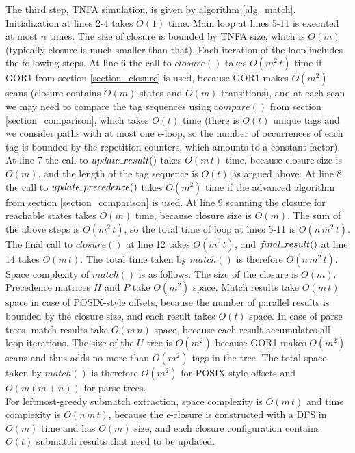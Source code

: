 \documentclass[AMA,STIX1COL]{WileyNJD-v2}
\newcommand{\Xund}{\rule{.4em}{.4pt}}
\begin{document}
The third step, TNFA simulation, is given by algorithm \ref{alg_match}.
Initialization at lines 2-4 takes $O(1)$ time.
Main loop at lines 5-11 is executed at most $n$ times.
The size of closure is bounded by TNFA size, which is $O(m)$ (typically closure is much smaller than that).
Each iteration of the loop includes the following steps.
%
At line 6 the call to $closure()$ takes $O(m^2 \, t)$ time if GOR1 from section \ref{section_closure} is used,
because GOR1 makes $O(m^2)$ scans (closure contains $O(m)$ states and $O(m)$ transitions),
and at each scan we may need to compare the tag sequences using $compare()$ from section \ref{section_comparison},
which takes $O(t)$ time
(there is $O(t)$ unique tags and we consider paths with at most one $\epsilon$-loop,
so the number of occurrences of each tag is bounded by the repetition counters,
which amounts to a constant factor).
%
At line 7 the call to $update \Xund result()$ takes $O(m \, t)$ time,
because closure size is $O(m)$,
and the length of the tag sequence is $O(t)$ as argued above.
%
At line 8 the call to $update \Xund precedence ()$ takes $O(m^2)$ time
if the advanced algorithm from section \ref{section_comparison} is used.
%
At line 9 scanning the closure for reachable states takes $O(m)$ time,
because closure size is $O(m)$.
%
The sum of the above steps is $O(m^2 \, t)$, so the total time of loop at lines 5-11 is $O(n \, m^2 \, t)$.
The final call to $closure()$ at line 12 takes $O(m^2 \, t)$,
and $f\!inal \Xund result ()$ at line 14 takes $O(m \, t)$.
The total time taken by $match()$ is therefore $O(n \, m^2 \, t)$.
\\

Space complexity of $match()$ is as follows.
%
The size of the closure is $O(m)$.
%
Precedence matrices $H$ and $P$ take $O(m^2)$ space.
%
Match results take $O(m \, t)$ space in case of POSIX-style offsets,
because the number of parallel results is bounded by the closure size,
and each result takes $O(t)$ space.
In case of parse trees, match results take $O(m \, n)$ space, because each result accumulates all loop iterations.
%
The size of the $U$-tree is $O(m^2)$
because GOR1 makes $O(m^2)$ scans and thus adds no more than $O(m^2)$ tags in the tree.
The total space taken by $match()$ is therefore $O(m^2)$
for POSIX-style offsets and $O(m (m + n))$ for parse trees.
\\

For leftmost-greedy submatch extraction,
space complexity is $O(m \, t)$ and time complexity is $O(n \, m \, t)$,
because the $\epsilon$-closure is constructed with a DFS in $O(m)$ time and has $O(m)$ size,
and each closure configuration contains $O(t)$ submatch results that need to be updated.
\end{document}
